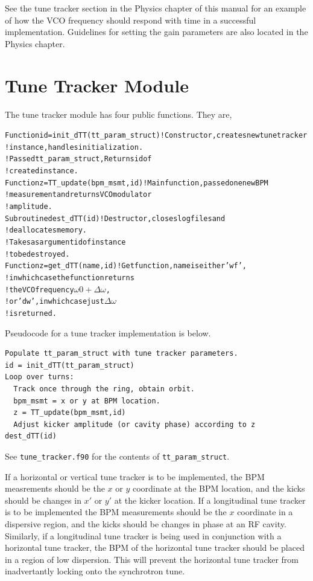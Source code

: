 See the tune tracker section in the Physics chapter of this manual for an example of how
the VCO frequency should respond with time in a successful implementation.  Guidelines for
setting the gain parameters are also located in the Physics chapter.

\section{Tune Tracker Module}
The tune tracker module has four public functions.  They are,
\begin{alltt}
Function id = init_dTT(tt_param_struct)     !Constructor, creates new tune tracker 
                                            !instance, handles initialization.
                                            !Passed tt_param_struct, Returns id of 
                                            !created instance.
Function z = TT_update(bpm_msmt,id)         !Main function, passed one new BPM 
                                            !measurement and returns VCO modulator 
                                            !amplitude.
Subroutine dest_dTT(id)                     !Destructor, closes log files and 
                                            !deallocates memory.
                                            !Takes as argument id of instance 
                                            !to be destroyed.
Function z = get_dTT(name,id)               !Get function, name is either 'wf', 
                                            !in which case the function returns 
                                            !the VCO frequency \(\omega0+\Delta\omega\), 
                                            !or 'dw', in which case just \(\Delta\omega\)
                                            !is returned.
\end{alltt}

Pseudocode for a tune tracker implementation is below.
\begin{verbatim}
Populate tt_param_struct with tune tracker parameters.
id = init_dTT(tt_param_struct)
Loop over turns:
  Track once through the ring, obtain orbit.
  bpm_msmt = x or y at BPM location.
  z = TT_update(bpm_msmt,id)
  Adjust kicker amplitude (or cavity phase) according to z
dest_dTT(id)
\end{verbatim}

See {\tt tune\_tracker.f90} for the contents of {\tt tt\_param\_struct}.

If a horizontal or vertical tune tracker is to be implemented, the BPM measrements 
should be the $x$ or $y$ coordinate at the BPM location, and the kicks should be
changes in $x'$ or $y'$ at the kicker location.  If a longitudinal
tune tracker is to be implemented the BPM measurements should be the $x$ coordinate
in a dispersive region, and the kicks should be changes in phase at an RF cavity.
Similarly, if a longitudinal tune tracker is being used in conjunction with a 
horizontal tune tracker, the BPM of the horizontal tune tracker should be placed
in a region of low dispersion.  This will prevent the horizontal tune tracker from 
inadvertantly locking onto the synchrotron tune.

